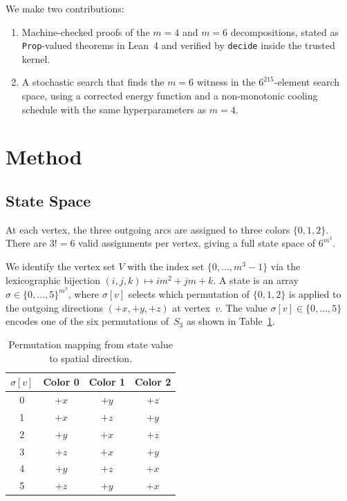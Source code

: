 \documentclass[11pt]{article}
\theoremstyle{plain}
\begin{document}
We make two contributions:
\begin{enumerate}
  \item Machine-checked proofs of the $m = 4$ and $m = 6$ decompositions,
  stated as \texttt{Prop}-valued theorems in Lean~4 and verified by
  \texttt{decide} inside the trusted kernel.
  \item A stochastic search that finds the $m=6$ witness in the
  $6^{215}$-element search space, using a corrected energy function and a
  non-monotonic cooling schedule with the same hyperparameters as $m=4$.
\end{enumerate}

\section{Method}

\subsection{State Space}

At each vertex, the three outgoing arcs are assigned to three colors
$\{0, 1, 2\}$. There are $3! = 6$ valid assignments per vertex, giving a
full state space of $6^{m^3}$.

We identify the vertex set $V$ with the index set $\{0, \ldots, m^3{-}1\}$
via the lexicographic bijection $(i,j,k) \mapsto im^2 + jm + k$.
A state is an array $\sigma \in \{0, \ldots, 5\}^{m^3}$, where
$\sigma[v]$ selects which permutation of $\{0,1,2\}$ is applied to the
outgoing directions $(+x, +y, +z)$ at vertex~$v$. The value
$\sigma[v] \in \{0,\ldots,5\}$ encodes one of the six permutations
of~$S_3$ as shown in Table~\ref{tab:permutations}.

\begin{table}[h]
\centering
\caption{Permutation mapping from state value to spatial direction.}
\label{tab:permutations}
\begin{tabular}{@{}cccc@{}}
\toprule
$\sigma[v]$ & Color 0 & Color 1 & Color 2 \\
\midrule
0 & $+x$ & $+y$ & $+z$ \\
1 & $+x$ & $+z$ & $+y$ \\
2 & $+y$ & $+x$ & $+z$ \\
3 & $+z$ & $+x$ & $+y$ \\
4 & $+y$ & $+z$ & $+x$ \\
5 & $+z$ & $+y$ & $+x$ \\
\bottomrule
\end{tabular}
\end{table}
\end{document}
